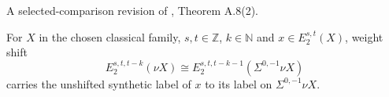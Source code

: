 \begin{theorem}
\label{frontier:Literature:6d7a8d6a798c}
A selected-comparison revision of \cite{BHS}, Theorem A.8(2).\par

For $X$ in the chosen classical family, $s,t\in\mathbb Z$, $k\in\mathbb N$ and $x\in E_2^{s,t}(X)$, weight shift\[E_2^{s,t,t-k}(\nu X)\cong E_2^{s,t,t-k-1}(\Sigma^{0,-1}\nu X)\]carries the unshifted synthetic label of $x$ to its label on $\Sigma^{0,-1}\nu X$.
\end{theorem}

